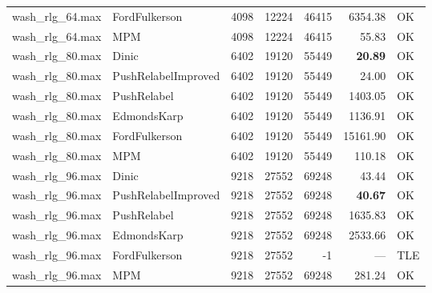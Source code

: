 \begin{longtable}{llrrrrl}
wash\_rlg\_64.max & FordFulkerson & 4098 & 12224 & 46415 & 6354.38 & OK \\
wash\_rlg\_64.max & MPM & 4098 & 12224 & 46415 & 55.83 & OK \\
\midrule
wash\_rlg\_80.max & Dinic & 6402 & 19120 & 55449 & \textbf{20.89} & OK \\
wash\_rlg\_80.max & PushRelabelImproved & 6402 & 19120 & 55449 & 24.00 & OK \\
wash\_rlg\_80.max & PushRelabel & 6402 & 19120 & 55449 & 1403.05 & OK \\
wash\_rlg\_80.max & EdmondsKarp & 6402 & 19120 & 55449 & 1136.91 & OK \\
wash\_rlg\_80.max & FordFulkerson & 6402 & 19120 & 55449 & 15161.90 & OK \\
wash\_rlg\_80.max & MPM & 6402 & 19120 & 55449 & 110.18 & OK \\
\midrule
wash\_rlg\_96.max & Dinic & 9218 & 27552 & 69248 & 43.44 & OK \\
wash\_rlg\_96.max & PushRelabelImproved & 9218 & 27552 & 69248 & \textbf{40.67} & OK \\
wash\_rlg\_96.max & PushRelabel & 9218 & 27552 & 69248 & 1635.83 & OK \\
wash\_rlg\_96.max & EdmondsKarp & 9218 & 27552 & 69248 & 2533.66 & OK \\
wash\_rlg\_96.max & FordFulkerson & 9218 & 27552 & -1 & --- & TLE \\
wash\_rlg\_96.max & MPM & 9218 & 27552 & 69248 & 281.24 & OK \\
\end{longtable}
\endgroup
